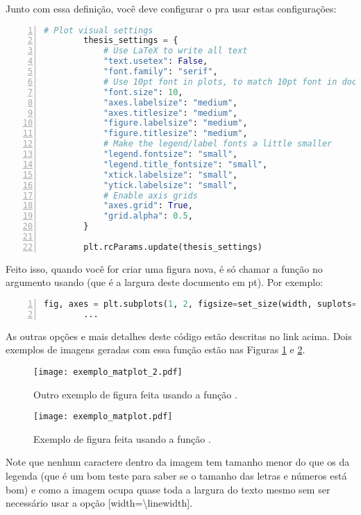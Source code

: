       Junto com essa definição, você deve configurar o  pra usar estas configurações:
      \begin{lstlisting}[label=code, language=Python, numbers=left, autogobble]          
        # Plot visual settings
        thesis_settings = {
            # Use LaTeX to write all text
            "text.usetex": False,
            "font.family": "serif",
            # Use 10pt font in plots, to match 10pt font in document
            "font.size": 10,
            "axes.labelsize": "medium",
            "axes.titlesize": "medium",
            "figure.labelsize": "medium",
            "figure.titlesize": "medium",
            # Make the legend/label fonts a little smaller
            "legend.fontsize": "small",
            "legend.title_fontsize": "small",
            "xtick.labelsize": "small",
            "ytick.labelsize": "small",
            # Enable axis grids
            "axes.grid": True,
            "grid.alpha": 0.5,
        }

        plt.rcParams.update(thesis_settings)
      \end{lstlisting}

      Feito isso, quando você for criar uma figura nova, é só chamar a função no argumento  usando  (que é a largura deste documento em pt). Por exemplo:
      \begin{lstlisting}[label=code, language=Python, numbers=left, autogobble]          
        fig, axes = plt.subplots(1, 2, figsize=set_size(width, suplots=(1, 2), fraction=1))
        ...
      \end{lstlisting}

      As outras opções e mais detalhes deste código estão descritas no link acima. Dois exemplos de imagens geradas com essa função estão nas Figuras \ref{fig:matplot_1} e \ref{fig:matplot_2}.
      \begin{figure}[h]
        \centering
        \texttt{[image: exemplo\_matplot\_2.pdf]}
        \caption{Outro exemplo de figura feita usando a função .}
        \label{fig:matplot_1}
      \end{figure}
      \begin{figure}[h]
        \centering
        \texttt{[image: exemplo\_matplot.pdf]}
        \caption{Exemplo de figura feita usando a função .}
        \label{fig:matplot_2}
      \end{figure}

      Note que nenhum caractere dentro da imagem tem tamanho menor do que os da legenda (que é um bom teste para saber se o tamanho das letras e números está bom) e como a imagem ocupa quase toda a largura do texto mesmo sem ser necessário usar a opção [width=\textbackslash linewidth].